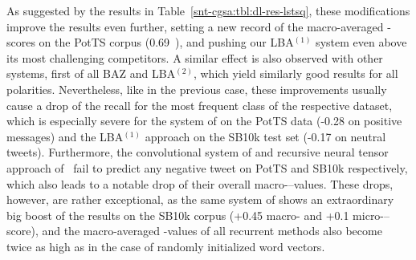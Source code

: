 As suggested by the results in Table~\ref{snt-cgsa:tbl:dl-res-lstsq},
these modifications improve the results even further, setting a new
record of the macro-averaged \F-scores on the PotTS corpus (0.69~\F),
and pushing our LBA$^{(1)}$ system even above its most challenging
competitors.  A similar effect is also observed with other systems,
first of all BAZ and LBA$^{(2)}$, which yield similarly good results
for all polarities.  Nevertheless, like in the previous case, these
improvements usually cause a drop of the recall for the most frequent
class of the respective dataset, which is especially severe for the
system of \citeauthor{Baziotis:17} on the PotTS data (-0.28 on
positive messages) and the LBA$^{(1)}$ approach on the SB10k test set
(-0.17 on neutral tweets).  Furthermore, the convolutional system of
\citeauthor{Severyn:15} and recursive neural tensor approach
of~\citet{Socher:13} fail to predict any negative tweet on PotTS and
SB10k respectively, which also leads to a notable drop of their
overall macro-\F--values.  These drops, however, are rather
exceptional, as the same system of \citeauthor{Severyn:15} shows an
extraordinary big boost of the results on the SB10k corpus (+0.45
macro-\F{} and +0.1 micro-\F--score), and the macro-averaged \F-values
of all recurrent methods also become twice as high as in the case of
randomly initialized word vectors.

